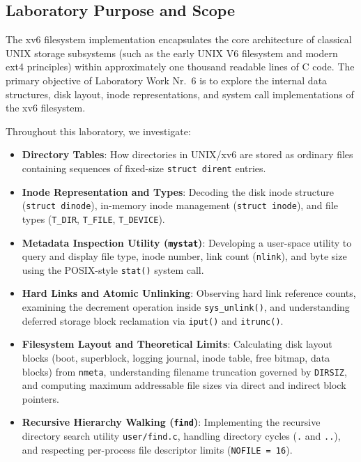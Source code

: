 \documentclass[12pt,a4paper]{article}
\begin{document}
\subsection{Laboratory Purpose and Scope}
The xv6 filesystem implementation encapsulates the core architecture of classical UNIX storage subsystems (such as the early UNIX V6 filesystem and modern ext4 principles) within approximately one thousand readable lines of C code. The primary objective of Laboratory Work Nr.~6 is to explore the internal data structures, disk layout, inode representations, and system call implementations of the xv6 filesystem.

Throughout this laboratory, we investigate:
\begin{itemize}
    \item \textbf{Directory Tables}: How directories in UNIX/xv6 are stored as ordinary files containing sequences of fixed-size \texttt{struct dirent} entries.
    \item \textbf{Inode Representation and Types}: Decoding the disk inode structure (\texttt{struct dinode}), in-memory inode management (\texttt{struct inode}), and file types (\texttt{T\_DIR}, \texttt{T\_FILE}, \texttt{T\_DEVICE}).
    \item \textbf{Metadata Inspection Utility (\texttt{mystat})}: Developing a user-space utility to query and display file type, inode number, link count (\texttt{nlink}), and byte size using the POSIX-style \texttt{stat()} system call.
    \item \textbf{Hard Links and Atomic Unlinking}: Observing hard link reference counts, examining the decrement operation inside \texttt{sys\_unlink()}, and understanding deferred storage block reclamation via \texttt{iput()} and \texttt{itrunc()}.
    \item \textbf{Filesystem Layout and Theoretical Limits}: Calculating disk layout blocks (boot, superblock, logging journal, inode table, free bitmap, data blocks) from \texttt{nmeta}, understanding filename truncation governed by \texttt{DIRSIZ}, and computing maximum addressable file sizes via direct and indirect block pointers.
    \item \textbf{Recursive Hierarchy Walking (\texttt{find})}: Implementing the recursive directory search utility \texttt{user/find.c}, handling directory cycles (\texttt{.} and \texttt{..}), and respecting per-process file descriptor limits (\texttt{NOFILE = 16}).
\end{itemize}
\end{document}

